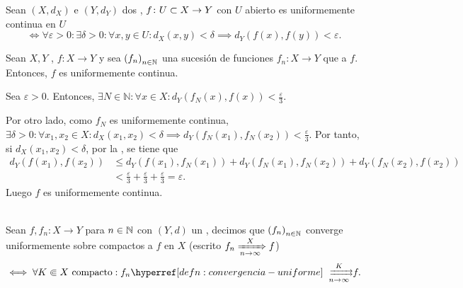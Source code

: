 \begin{defn}\label{defn:continuidad-uniforme}
    Sean $\left(X, d_X\right)$ e $\left(Y, d_Y\right)$ dos , $f \colon U \subset X \to Y$ con $U$ abierto es uniformemente continua en $U$
    \[
        \iff \forall \varepsilon > 0 : \exists \delta > 0 : \forall x, y \in U : d_X(x, y) < \delta \implies d_Y\left(f(x), f(y)\right) < \varepsilon.
    \]
\end{defn}

\begin{prop}\label{prop:convergencia-uniforme-continuidad-uniforme}
    Sean $X, Y$ , $f \colon X \to Y$ y sea $\left(f_n\right)_{n \in \mathbb{N}}$ una sucesión de funciones $f_n \colon X \to Y$  que  a $f$. Entonces, $f$ es uniformemente continua.
\end{prop}
\begin{dem}
    Sea $\varepsilon > 0$. Entonces, $\exists N \in \mathbb{N} : \forall x \in X : d_Y(f_N(x), f(x)) < \frac{\varepsilon}{3}$.

    Por otro lado, como $f_N$ es uniformemente continua, $\exists \delta > 0 : \forall x_1, x_2 \in X : d_X(x_1, x_2) < \delta \implies d_Y(f_N(x_1), f_N(x_2)) < \frac{\varepsilon}{3}$. Por tanto, si $d_X(x_1, x_2) < \delta$, por la , se tiene que
    \begin{align*}
        d_Y(f(x_1), f(x_2)) &\leq d_Y(f(x_1), f_N(x_1)) + d_Y(f_N(x_1), f_N(x_2)) + d_Y(f_N(x_2), f(x_2)) \\
        &< \frac{\varepsilon}{3} + \frac{\varepsilon}{3} + \frac{\varepsilon}{3} = \varepsilon.
    \end{align*}
    Luego $f$ es uniformemente continua.
\end{dem}

\begin{defn}\label{defn:convergencia-uniforme-compactos}\mbox{}\\
    Sean $f, f_n \colon X \to Y$ para $n\in\mathbb{N}$ con $\left(Y, d\right)$ un , decimos que $\left(f_n\right)_{n\in\mathbb{N}}$ converge uniformemente sobre compactos a $f$ en $X$ (escrito $f_n \xRightarrow[n\to\infty]{X} f$)
    \[
    \iff \forall K \Subset X \tex{ compacto} : f_n \exhyperref[defn:convergencia-uniforme]{convergencia-uniforme}{\xrightrightarrows[n\to\infty]{K}} f.
    \]
\end{defn}

